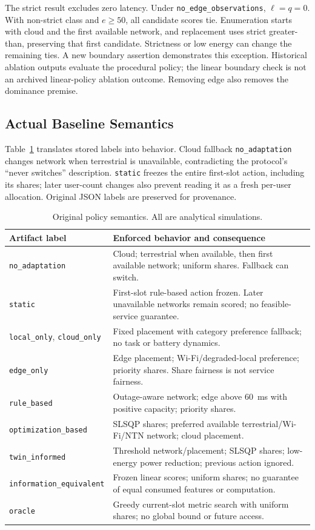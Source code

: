 \documentclass[10pt,twocolumn]{article}
\newcommand{\pol}[1]{\texttt{#1}}
\begin{document}
The strict result excludes zero latency. Under \pol{no\_edge\_observations}, $\ell=q=0$. With non-strict class and $e\ge50$, all candidate scores tie. Enumeration starts with cloud and the first available network, and replacement uses strict greater-than, preserving that first candidate. Strictness or low energy can change the remaining ties. A new boundary assertion demonstrates this exception. Historical ablation outputs evaluate the procedural policy; the linear boundary check is not an archived linear-policy ablation outcome. Removing edge also removes the dominance premise.

\subsection{Actual Baseline Semantics}
Table~\ref{tab:semantics} translates stored labels into behavior. Cloud fallback \pol{no\_adaptation} changes network when terrestrial is unavailable, contradicting the protocol's ``never switches'' description. \pol{static} freezes the entire first-slot action, including its shares; later user-count changes also prevent reading it as a fresh per-user allocation. Original JSON labels are preserved for provenance.
\begin{table}[t]
\caption{Original policy semantics. All are analytical simulations.}\label{tab:semantics}
\centering\small
\begin{tabular}{p{}p{}}
\toprule Artifact label & Enforced behavior and consequence \\
\midrule
\pol{no\_adaptation} & Cloud; terrestrial when available, then first available network; uniform shares. Fallback can switch. \\
\pol{static} & First-slot rule-based action frozen. Later unavailable networks remain scored; no feasible-service guarantee. \\
\pol{local\_only}, \pol{cloud\_only} & Fixed placement with category preference fallback; no task or battery dynamics. \\
\pol{edge\_only} & Edge placement; Wi-Fi/degraded-local preference; priority shares. Share fairness is not service fairness. \\
\pol{rule\_based} & Outage-aware network; edge above 60~ms with positive capacity; priority shares. \\
\pol{optimization\_based} & SLSQP shares; preferred available terrestrial/Wi-Fi/NTN network; cloud placement. \\
\pol{twin\_informed} & Threshold network/placement; SLSQP shares; low-energy power reduction; previous action ignored. \\
\pol{information\_equivalent} & Frozen linear scores; uniform shares; no guarantee of equal consumed features or computation. \\
\pol{oracle} & Greedy current-slot metric search with uniform shares; no global bound or future access. \\
\bottomrule\end{tabular}
\end{table}
\end{document}
